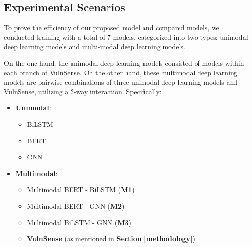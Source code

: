 \subsection{Experimental Scenarios}

To prove the efficiency of our proposed model and compared models, we conducted training with a total of 7 models, categorized into two types: unimodal deep learning models and multi-modal deep learning models.

On the one hand, the unimodal deep learning models consisted of models within each branch of VulnSense. On the other hand, these multimodal deep learning models are pairwise combinations of three unimodal deep learning models and VulnSense, utilizing a 2-way interaction. Specifically:
\begin{itemize}
    \item \textbf{Unimodal}:
    \begin{itemize}
        \item BiLSTM
        \item BERT
        \item GNN
    \end{itemize}
    \item \textbf{Multimodal}:
    \begin{itemize}
        \item Multimodal BERT - BiLSTM (\textbf{M1})
        \item Multimodal BERT - GNN (\textbf{M2})
        \item Multimodal BiLSTM - GNN (\textbf{M3})
        \item \textbf{VulnSense} (as mentioned in \textbf{Section \ref{methodology}})
    \end{itemize}    
\end{itemize}
